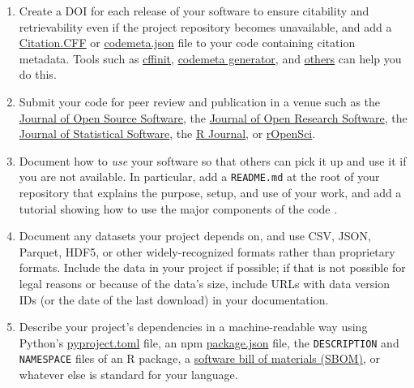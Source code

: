 \documentclass[10pt,letterpaper]{article}
\begin{document}
\begin{enumerate}

\item
  Create a DOI for each release of your software
  to ensure citability and retrievability even if the project repository becomes unavailable,
  and add a \href{https://citation-file-format.github.io/}{Citation.CFF}
  or \href{https://codemeta.github.io}{codemeta.json} file to your code \cite{Druskat2021}
  containing citation metadata.
  Tools such as \href{https://citation-file-format.github.io/cff-initializer-javascript/}{cffinit},
  \href{https://codemeta.github.io/codemeta-generator/}{codemeta generator},
  and \href{https://github.com/citation-file-format/citation-file-format/blob/main/README.md\#tools-to-work-with-citationcff-files-wrench}{others}
  can help you do this.

\item
  Submit your code for peer review and publication in a venue such as
  the \href{https://joss.theoj.org/}{Journal of Open Source Software},
  the \href{https://openresearchsoftware.metajnl.com/}{Journal of Open Research Software},
  the \href{http://www.jstatsoft.org}{Journal of Statistical Software},
  the \href{https://journal.r-project.org/}{R Journal},
  or \href{https://ropensci.org/}{rOpenSci}.

\item
  Document how to \emph{use} your software so that others can pick it up and use it if you are not available.
  In particular,
  add a \texttt{README.md} at the root of your repository
  that explains the purpose, setup, and use of your work,
  and add a tutorial showing how to use the major components of the code
  \cite{Lee2018b,Huybrechts2024,Littauer2025,Katz2025,Turing2025}.

\item
  Document any datasets your project depends on,
  and use CSV, JSON, Parquet, HDF5, or other widely-recognized formats rather than proprietary formats.
  Include the data in your project if possible;
  if that is not possible for legal reasons or because of the data's size,
  include URLs with data version IDs (or the date of the last download) in your documentation.

\item
  Describe your project's dependencies in a machine-readable way
  using Python's \href{https://packaging.python.org/en/latest/guides/writing-pyproject-toml/}{pyproject.toml} file,
  an npm \href{https://docs.npmjs.com/cli/v10/configuring-npm/package-json?v=true}{package.json} file,
  the \texttt{DESCRIPTION} and \texttt{NAMESPACE} files of an R package, a \href{https://openssf.org/technical-initiatives/sbom-tools/}{software bill of materials (SBOM)},
  or whatever else is standard for your language.


\end{enumerate}
\end{document}

